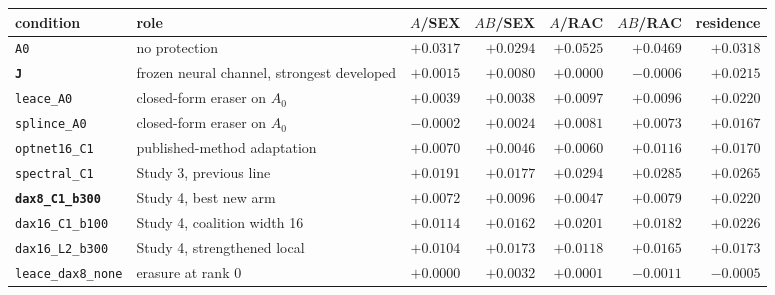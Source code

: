 \begin{tabular}{l l r r r r r}
\toprule
condition & role & $A$/SEX & $AB$/SEX & $A$/RAC & $AB$/RAC & residence \\
\midrule
\texttt{A0} & no protection & $+0.0317$ & $+0.0294$ & $+0.0525$ & $+0.0469$ & $+0.0318$ \\
\bfseries \texttt{J} & frozen neural channel, strongest developed & $+0.0015$ & $+0.0080$ & $+0.0000$ & $-0.0006$ & $+0.0215$ \\
\texttt{leace\_A0} & closed-form eraser on $A_0$ & $+0.0039$ & $+0.0038$ & $+0.0097$ & $+0.0096$ & $+0.0220$ \\
\texttt{splince\_A0} & closed-form eraser on $A_0$ & $-0.0002$ & $+0.0024$ & $+0.0081$ & $+0.0073$ & $+0.0167$ \\
\texttt{optnet16\_C1} & published-method adaptation & $+0.0070$ & $+0.0046$ & $+0.0060$ & $+0.0116$ & $+0.0170$ \\
\texttt{spectral\_C1} & Study 3, previous line & $+0.0191$ & $+0.0177$ & $+0.0294$ & $+0.0285$ & $+0.0265$ \\
\midrule
\bfseries \texttt{dax8\_C1\_b300} & Study 4, best new arm & $+0.0072$ & $+0.0096$ & $+0.0047$ & $+0.0079$ & $+0.0220$ \\
\texttt{dax16\_C1\_b100} & Study 4, coalition width 16 & $+0.0114$ & $+0.0162$ & $+0.0201$ & $+0.0182$ & $+0.0226$ \\
\texttt{dax16\_L2\_b300} & Study 4, strengthened local & $+0.0104$ & $+0.0173$ & $+0.0118$ & $+0.0165$ & $+0.0173$ \\
\texttt{leace\_dax8\_none} & erasure at rank 0 & $+0.0000$ & $+0.0032$ & $+0.0001$ & $-0.0011$ & $-0.0005$ \\
\bottomrule
\end{tabular}
